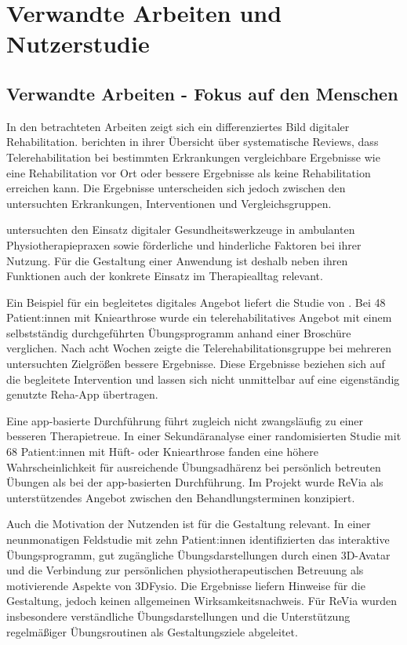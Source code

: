 \section{Verwandte Arbeiten und Nutzerstudie}
\subsection{Verwandte Arbeiten - Fokus auf den Menschen}
\label{sec:related-work}

In den betrachteten Arbeiten zeigt sich ein differenziertes Bild digitaler Rehabilitation. \textcite{seron2021} berichten in ihrer Übersicht über systematische Reviews, dass Telerehabilitation bei bestimmten Erkrankungen vergleichbare Ergebnisse wie eine Rehabilitation vor Ort oder bessere Ergebnisse als keine Rehabilitation erreichen kann. Die Ergebnisse unterscheiden sich jedoch zwischen den untersuchten Erkrankungen, Interventionen und Vergleichsgruppen.

\textcite{keel2023} untersuchten den Einsatz digitaler Gesundheitswerkzeuge in ambulanten Physiotherapiepraxen sowie förderliche und hinderliche Faktoren bei ihrer Nutzung. Für die Gestaltung einer Anwendung ist deshalb neben ihren Funktionen auch der konkrete Einsatz im Therapiealltag relevant.

Ein Beispiel für ein begleitetes digitales Angebot liefert die Studie von \textcite{tore2023}. Bei 48 Patient:innen mit Kniearthrose wurde ein telerehabilitatives Angebot mit einem selbstständig durchgeführten Übungsprogramm anhand einer Broschüre verglichen. Nach acht Wochen zeigte die Telerehabilitationsgruppe bei mehreren untersuchten Zielgrößen bessere Ergebnisse. Diese Ergebnisse beziehen sich auf die begleitete Intervention und lassen sich nicht unmittelbar auf eine eigenständig genutzte Reha-App übertragen.

Eine app-basierte Durchführung führt zugleich nicht zwangsläufig zu einer besseren Therapietreue. In einer Sekundäranalyse einer randomisierten Studie mit 68 Patient:innen mit Hüft- oder Kniearthrose fanden \textcite{martinsen2025} eine höhere Wahrscheinlichkeit für ausreichende Übungsadhärenz bei persönlich betreuten Übungen als bei der app-basierten Durchführung. Im Projekt wurde ReVia als unterstützendes Angebot zwischen den Behandlungsterminen konzipiert.

Auch die Motivation der Nutzenden ist für die Gestaltung relevant. In einer neunmonatigen Feldstudie mit zehn Patient:innen identifizierten \textcite{ahtinen2019} das interaktive Übungsprogramm, gut zugängliche Übungsdarstellungen durch einen 3D-Avatar und die Verbindung zur persönlichen physiotherapeutischen Betreuung als motivierende Aspekte von 3DFysio. Die Ergebnisse liefern Hinweise für die Gestaltung, jedoch keinen allgemeinen Wirksamkeitsnachweis. Für ReVia wurden insbesondere verständliche Übungsdarstellungen und die Unterstützung regelmäßiger Übungsroutinen als Gestaltungsziele abgeleitet.

